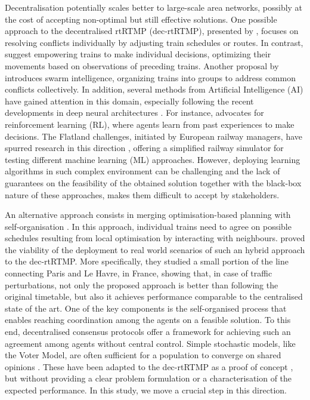 Decentralisation potentially scales better to large-scale area networks, possibly at the cost of accepting non-optimal but still effective solutions.
One possible approach to the decentralised rtRTMP (dec-rtRTMP), presented by \cite{Vanthielen2019}, focuses on resolving conflicts individually by adjusting train schedules or routes. In contrast, \cite{shang2018distributed} suggest empowering trains to make individual decisions, optimizing their movements based on observations of preceding trains. Another proposal by \cite{cui2017swarm} introduces swarm intelligence, organizing trains into groups to address common conflicts collectively.
%
In addition, several methods from Artificial Intelligence (AI) have gained attention in this domain, especially following the recent developments in deep neural architectures \cite{JusupTrivellaCorman}. For instance, \cite{Khadilkar} advocates for reinforcement learning (RL), where agents learn from past experiences to make decisions. The Flatland challenges, initiated by European railway managers, have spurred research in this direction \cite{mohanty2020flatlandrl}, offering a simplified railway simulator for testing different machine learning (ML) approaches. However, deploying learning algorithms in such complex environment can be challenging and the lack of  guarantees on the feasibility of the obtained solution together with the black-box nature of these approaches, makes them difficult to accept by stakeholders.


An alternative approach consists in merging optimisation-based planning with self-organisation \cite{DAMATO2024100427}. In this approach, individual trains need to agree on possible schedules resulting from local optimisation by interacting with neighbours. 
\cite{DAMATO2024100427} proved the viability of the deployment to real world scenarios of such an hybrid approach to the dec-rtRTMP. More specifically, they studied a small portion of the line connecting Paris and Le Havre, in France, showing that, in case of traffic perturbations, not only the proposed approach is better than following the original timetable, but also it achieves performance comparable to the centralised state of the art. One of the key components is the self-organised process that enables reaching coordination among the agents on a feasible solution. To this end, decentralised consensus protocols \cite{Paxos:Lamport,amirkhani2022consensus} offer a framework for achieving such an agreement among agents without central control. Simple stochastic models, like the Voter Model, are often sufficient for a population to converge on shared opinions \cite{Holley:1975we}. These have been adapted to the dec-rtRTMP as a proof of concept \cite{DAMATO2024100427}, but without providing a clear problem formulation or a characterisation of the expected performance. In this study, we move a crucial step in this direction. 

